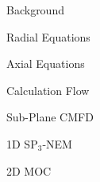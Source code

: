 \begin{frame}[t]{Background}
    
    
    
\end{frame}


\begin{frame}[t]{Radial Equations}
    
    
    
\end{frame}


\begin{frame}[t]{Axial Equations}
    
    
    
\end{frame}


\begin{frame}[t]{Calculation Flow}



\end{frame}


\begin{frame}[t]{Sub-Plane CMFD}
    
    
    
\end{frame}


\begin{frame}[t]{1D SP$_3$-NEM}
    
    
    
\end{frame}


\begin{frame}[t]{2D MOC}



\end{frame} 